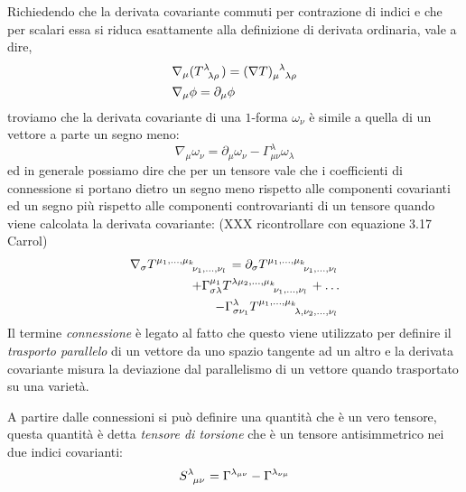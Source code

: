 \documentclass[twoside]{article}
\begin{document}
Richiedendo che la derivata covariante commuti per contrazione di indici e che per scalari essa si riduca esattamente alla definizione di derivata ordinaria, vale a dire,
\begin{align}
	&\nabla_{\mu}(T\indices{^\lambda_{\lambda \rho}}) = (\nabla T)\indices{_\mu^\lambda_{\lambda \rho}} \nonumber \\
&\nabla_\mu \phi = \partial_\mu \phi
\end{align}
troviamo che la derivata covariante di una $1$-forma $\omega_\nu$ è simile a quella di un vettore a parte un segno meno:
\begin{equation}\label{eq:covariantderivative1forms}
\nabla_{\mu}\omega_\nu = \partial_{\mu}\omega_\nu - \Gamma^{\lambda}_{\mu \nu}\omega_\lambda
\end{equation}
ed in generale possiamo dire che per un tensore vale che i coefficienti di connessione si portano dietro un segno meno rispetto alle componenti covarianti ed un segno più rispetto alle componenti controvarianti di un tensore quando viene calcolata la derivata covariante:
(XXX ricontrollare con equazione 3.17 Carrol)
\begin{align}
\nabla_{\sigma}T\indices{^{\mu_1,\ldots,\mu_k}_{\nu_1,\ldots,\nu_l}} = \partial_{\sigma} T\indices{^{\mu_1,\ldots,\mu_k}_{\nu_1,\ldots,\nu_l}} \nonumber \\
+ \Gamma^{\mu_1}_{\sigma \lambda} T\indices{^{\lambda \mu_2,\ldots,\mu_k}_{\nu_1,\ldots,\nu_l}} + \ldots \nonumber \\
- \Gamma^{\lambda}_{\sigma \nu_1} T\indices{^{\mu_1,\ldots,\mu_k}_{\lambda,\nu_2,\ldots,\nu_l}}  
\end{align}
Il termine \emph{connessione} è legato al fatto che questo viene utilizzato per definire il \emph{trasporto parallelo} di un vettore da uno spazio tangente ad un altro e la derivata covariante misura la deviazione dal parallelismo di un vettore quando trasportato su una varietà.

A partire dalle connessioni si può definire una quantità che è un vero tensore, questa quantità è detta \emph{tensore di torsione} che è un tensore antisimmetrico nei due indici covarianti:
\begin{equation}
	S\indices{^\lambda_{\mu \nu}} = \Gamma^{\lambda_{\mu \nu}} - {\Gamma}^{\lambda_{\nu \mu	}}
\end{equation}
\end{document}
